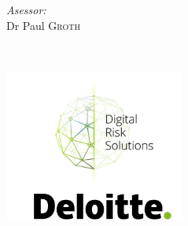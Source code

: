 \documentclass{article}
\newcommand{\red}[1]{{\color{red}{#1}}}
\begin{document}
\begin{titlepage}
\begin{minipage}[t]{0.4\textwidth}
\begin{flushright}
\emph{Asessor:} \\

Dr Paul \textsc{Groth}\\

\end{flushright}

\end{minipage}\\[2cm]








\begin{minipage}{\textwidth}
    \centering
    \includegraphics[height=5cm]{data/images/deloitte_thesis_cover6.png} %
\end{minipage}


 




\vfill %


\afterpage{\null\newpage}

\end{titlepage}
\end{document}

